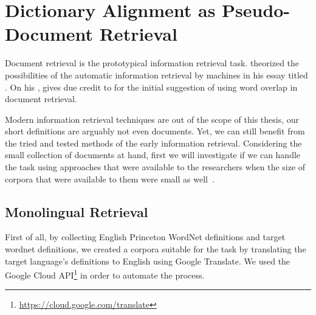 
\chapter{Dictionary Alignment as Pseudo-Document Retrieval}%
\label{chap:retrieval}

Document retrieval is the prototypical information retrieval task.
\textcite{bush_as_1945} theorized the possibilities of the automatic information retrieval by machines in his essay titled .
On his , \textcite{singhal_modern_2001} gives due credit to \textcite{luhn_statistical_1957} for the initial suggestion of using word overlap in document retrieval.

Modern information retrieval techniques are out of the scope of this thesis, our short definitions are arguably not even documents.
Yet, we can still benefit from the tried and tested methods of the early information retrieval.
Considering the small collection of documents at hand, first we will investigate if we can handle the task using approaches that were available to the researchers when the size of corpora that were available to them were small as well~\cite{singhal_modern_2001}.

\section{Monolingual Retrieval}

First of all, by collecting English Princeton WordNet definitions and target wordnet definitions, we created a corpora suitable for the task by translating the target language's definitions to English using Google Translate.
We used the Google Cloud API\footnote{\url{https://cloud.google.com/translate}} in order to automate the process.

